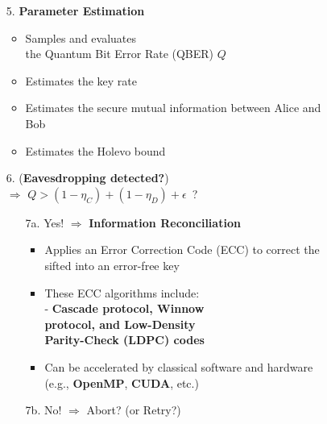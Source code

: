 \documentclass{beamer}
\begin{document}
\begin{frame}
\begin{figure}
\begin{minipage}{0.4\textwidth}
                    \caption{\color{blue}{Figure 2: }\color{black}{Flowchart of a QKD protocol}}
                    \label{fig:qkd-protocol-flowchart-2}
                \end{minipage}%
                \hspace{0.05\textwidth}%
                \begin{minipage}{0.55\textwidth}
                    \begin{enumerate}\footnotesize
                        \item[5.] \textbf{Parameter Estimation}
                        \begin{itemize}\scriptsize
                            \item Samples and evaluates\\ the Quantum Bit Error Rate (QBER) $Q$
                            \item Estimates the key rate
                            \item Estimates the secure mutual information between Alice and Bob
                            \item Estimates the Holevo bound
                        \end{itemize}
                        \item[6.] (\textbf{Eavesdropping detected?})\\$\Rightarrow$ $Q > (1 - {\eta}_{C}) + (1 - {\eta}_{D}) + \epsilon$\ ?
                        \begin{enumerate}\scriptsize
                            \item[7a.] Yes! $\Rightarrow$ \textbf{Information Reconciliation}
                            \begin{itemize}\scriptsize
                                \item Applies an Error Correction Code (ECC) to correct the sifted into an error-free key
                                \item These ECC algorithms include:\\
                                - \textbf{Cascade protocol, Winnow\\\hspace{1ex}protocol, and Low-Density\\\hspace{1ex}Parity-Check (LDPC) codes}
                                \item Can be accelerated by classical software and hardware\\(e.g., \textbf{OpenMP}, \textbf{CUDA}, etc.)
                            \end{itemize}
                            \item[7b.] No! $\Rightarrow$ Abort? (or Retry?)
                        \end{enumerate}
                    \end{enumerate}
                \end{minipage}
            \end{figure}
   
		\end{frame}
  
\end{document}
